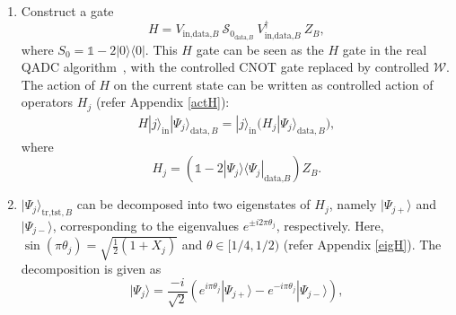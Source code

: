 \documentclass[a4paper,twocolumn,11pt,unpublished]{quantumarticle}
\newcommand{\rang}{\rangle}
\newcommand{\lang}{\langle}
\begin{document}
\begin{enumerate}
            \item 
                \label{step4_real}
                Construct a gate
                \begin{equation}
                    H = V_{\text{in,data,}B} \ \mathcal S_{0_{\text{data,}B}} \   V^\dag_{\text{in,data,}B} \ Z_B ,
                \end{equation}\label{eq:H}
                where $S_0 = \mathds{1} - 2 |0\rang \lang 0 |$. This $H$ gate can be seen as the $H$ gate in the real QADC algorithm~\cite{Mitarai2019}, with the controlled CNOT gate replaced by controlled $\mathcal{W}$. The action of $H$ on the current state can be written as controlled action of operators $H_j$ (refer Appendix \ref{actH}):
                \begin{equation}
                \begin{split}
                    H  |j\rang_\text{in}|\Psi_j\rang_{\text{data}, B} =  |j\rang_\text{in}\Big(H_j|\Psi_j\rang_{\text{data}, B}\Big), 
                \end{split}
                \end{equation}
                where
                \begin{equation}
                    H_j = \left(\mathds{1} - 2 {|\Psi_j \rang \lang \Psi_j |}_{\text{data,}B}\right) Z_B. 
                \end{equation}
            
            
            \item
                 $|\Psi_j\rang_{\text{tr,tst}, B}$ can be decomposed into two eigenstates of $H_j$, namely $|\Psi_{j+}\rang$ and $|\Psi_{j-}\rang$, corresponding to the eigenvalues $e^{\pm i 2\pi \theta_j}$, respectively. Here, $\sin (\pi\theta_j) = \sqrt{\frac{1}{2}(1 +X_j)}$ and $\theta \in [1/4, 1/2)$ (refer Appendix \ref{eigH}). The decomposition is given as
            \begin{equation}
                |\Psi_j \rang = \frac{-i}{\sqrt{2}} (e^{i\pi \theta_j} |\Psi_{j+}\rang - e^{-i\pi\theta_j} |\Psi_{j-}\rang),
            \end{equation}


\end{enumerate}
\end{document}
